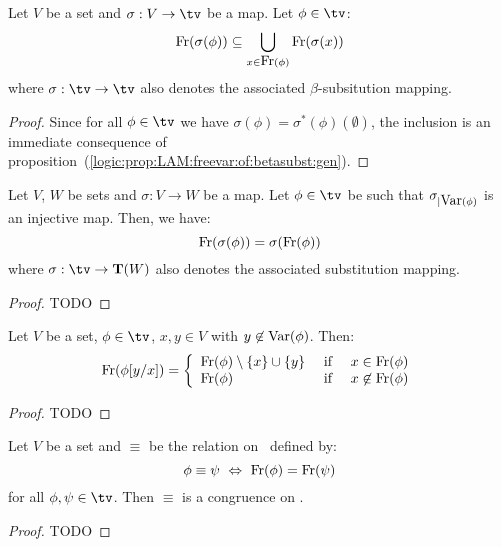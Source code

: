 \begin{prop}\label{logic:prop:LAM:freevar:of:betasubst:inclusion}
Let $V$ be a set and $\sigma:V\to\tv$ be a map. Let $\phi\in\tv$:
    \[
    \mbox{\rm Fr}(\sigma(\phi))\subseteq\bigcup_{x\in\mbox{\rm Fr}(\phi)} \mbox{\rm Fr}(\sigma(x))
    \]
where $\sigma:\tv\to\tv$ also denotes the associated $\beta$-subsitution mapping.
\end{prop}
\begin{proof}
Since for all $\phi\in\tv$ we have $\sigma(\phi)=\sigma^{*}(\phi)(\emptyset)$, 
the inclusion is an immediate consequence of 
proposition~(\ref{logic:prop:LAM:freevar:of:betasubst:gen}).
\end{proof}

\begin{prop}\label{logic:prop:LAM:freevar:of:substitution}
    Let $V$, $W$ be sets and $\sigma:V\to W$ be a map. Let $\phi\in\tv$ 
    be such that $\sigma_{|\mbox{\rm Var}(\phi)}$ is an injective map. Then, we have:
    \[
        \mbox{\rm Fr}(\sigma(\phi))=\sigma(\mbox{\rm Fr}(\phi))
    \]
    where $\sigma:\tv\to{\bf T}(W)$ also denotes the associated substitution 
    mapping.
\end{prop}
\begin{proof}
TODO
\end{proof}

\begin{prop}\label{logic:prop:LAM:freevar:single:subst}
    Let $V$ be a set, $\phi\in\tv$, $x,y\in V$ with $y\not\in\mbox{\rm Var}(\phi)$. Then:
    \[
        \mbox{\rm Fr}(\phi[y/x])=
            \left\{\begin{array}{lcl}
                \mbox{\rm Fr}(\phi)\setminus\{x\}\cup\{y\}
                    &\mbox{\ if\ }&
                x\in\mbox{\rm Fr}(\phi)
                \\
                \mbox{\rm Fr}(\phi)
                    &\mbox{\ if\ }&
                x\not\in\mbox{\rm Fr}(\phi)
            \end{array}\right.
    \]
\end{prop}
\begin{proof}
TODO
\end{proof}

\begin{prop}\label{logic:prop:LAM:congruence:freevar}
Let $V$ be a set and $\equiv$ be the relation on \tv\ defined by:
    \[
    \phi\equiv\psi\ \Leftrightarrow\ \free(\phi)=\free(\psi)
    \]
for all $\phi,\psi\in\tv$. Then $\equiv$ is a congruence on \tv.
\end{prop}
\begin{proof}
TODO
\end{proof}



